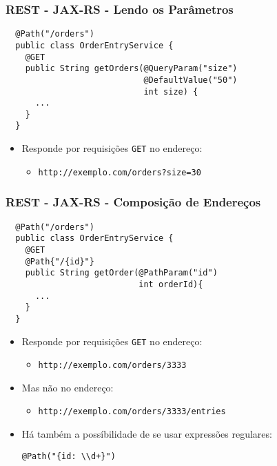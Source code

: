 \documentclass[Ligatures=TeX,table,brazil,svgnames,usetotalslideindicator,comp
ress,10pt]{beamer}
\begin{document}
\begin{frame}[fragile]
  \frametitle{REST - JAX-RS - Lendo os Parâmetros}

\begin{verbatim}
  @Path("/orders")
  public class OrderEntryService {
    @GET
    public String getOrders(@QueryParam("size")
                            @DefaultValue("50")
                            int size) {
      ...
    }
  }
\end{verbatim}

\begin{itemize}
\item Responde por requisições \alert{\texttt{GET}} no endereço:
  \begin{itemize}
  \item \texttt{http://exemplo.com/orders?\alert{size=30}}
  \end{itemize}
\end{itemize}
\end{frame}

\begin{frame}[fragile]
  \frametitle{REST - JAX-RS - Composição de Endereços}

\begin{verbatim}
  @Path("/orders")
  public class OrderEntryService {
    @GET
    @Path{"/{id}"}
    public String getOrder(@PathParam("id")
                           int orderId){
      ...
    }
  }
\end{verbatim}

\begin{itemize}
\item Responde por requisições \alert{\texttt{GET}} no endereço:
  \begin{itemize}
  \item \texttt{http://exemplo.com/orders/\alert{3333}}
  \end{itemize}
\item Mas não no endereço:
  \begin{itemize}
  \item \texttt{http://exemplo.com/orders/3333/entries}
  \end{itemize}
\item Há também a possíbilidade de se usar expressões regulares:
  \begin{verbatim}
@Path("{id: \\d+}")
  \end{verbatim}
\end{itemize}
\end{frame}
\end{document}

